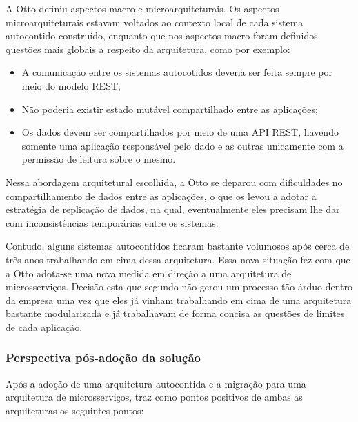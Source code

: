 A Otto definiu aspectos macro e microarquiteturais. Os aspectos
microarquiteturais estavam voltados ao contexto local de cada sistema autocontido construído,
enquanto que nos aspectos macro foram definidos questões mais globais a respeito da arquitetura, como por exemplo:

\begin{itemize}
    \item A comunicação entre os sistemas autocotidos deveria ser feita sempre por meio do modelo
        \gls{REST};
    \item Não poderia existir estado mutável compartilhado entre as aplicações;
    \item Os dados devem ser compartilhados por meio de uma \gls{API} \gls{REST}, havendo somente
        uma aplicação responsável pelo dado e as outras unicamente com a permissão de leitura sobre o
        mesmo.
\end{itemize}

Nessa abordagem arquitetural escolhida, a Otto se deparou com dificuldades no compartilhamento
de dados entre as aplicações, o que os levou a adotar a estratégia de replicação de dados, na qual,
eventualmente eles precisam lhe dar com inconsistências temporárias entre os sistemas.

Contudo, alguns sistemas autocontidos ficaram bastante volumosos após cerca de três anos trabalhando
em cima dessa arquitetura. Essa nova situação fez com que a Otto adota-se uma nova medida em direção
a uma arquitetura de microsserviços. Decisão esta que segundo 
não gerou um processo tão árduo dentro da empresa uma vez que eles já vinham trabalhando em cima de
uma arquitetura bastante modularizada e já trabalhavam de forma concisa as questões de limites de
cada aplicação.

\subsubsection{Perspectiva pós-adoção da solução}

Após a adoção de uma arquitetura autocontida e a migração para uma arquitetura de microsserviços,
 traz como pontos positivos de ambas as arquiteturas os
seguintes pontos:

